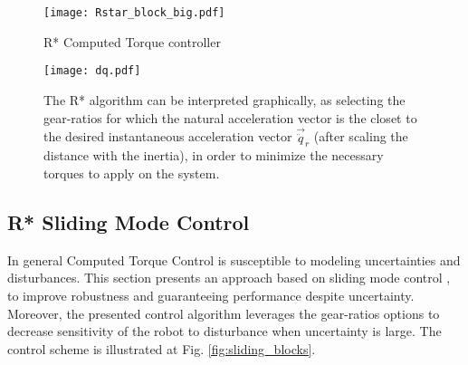 \begin{figure}[t]
	\centering
		\texttt{[image: Rstar\_block\_big.pdf]}
	\caption{R* Computed Torque controller}
	\label{fig:Rstar_block_big}
\end{figure}

\begin{figure}[htp]
	\centering
		\texttt{[image: dq.pdf]}
	\caption[R* algorithm graphical interpretation]{The R* algorithm can be interpreted graphically, as selecting the gear-ratios for which the natural acceleration vector is the closet to the desired instantaneous acceleration vector $\vec{\ddot{q}}_r$ (after scaling the distance with the inertia), in order to minimize the necessary torques to apply on the system.}
	\label{fig:dq}
\end{figure}

\subsection{R* Sliding Mode Control}
\label{sec:slidingmode}

In general Computed Torque Control is susceptible to modeling uncertainties and disturbances. This section presents an approach based on sliding mode control \cite{slotine_applied_1991}, to improve robustness and guaranteeing performance despite uncertainty. Moreover, the presented control algorithm leverages the gear-ratios options to decrease sensitivity of the robot to disturbance when uncertainty is large. The control scheme is illustrated at Fig. \ref{fig:sliding_blocks}.

